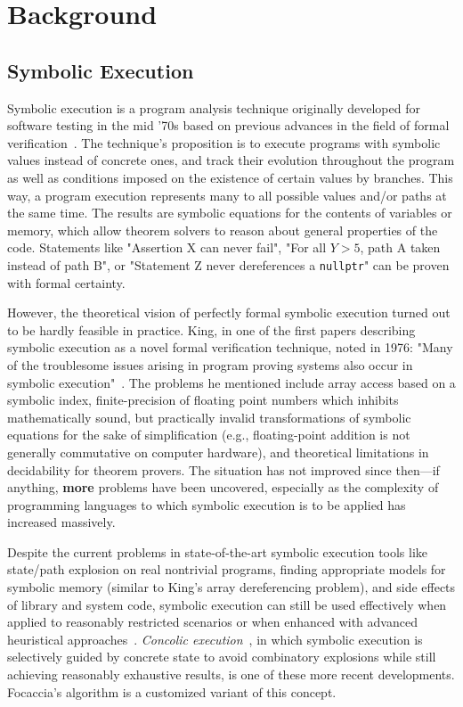 \chapter{Background}

\section{Symbolic Execution}

Symbolic execution is a program analysis technique originally developed for software testing in the mid '70s based on
previous advances in the field of formal verification~\cite{Boyer1975Select, King1975Effigy, Howden1977Dissect}. The
technique's proposition is to execute programs with symbolic values instead of concrete ones, and track their evolution
throughout the program as well as conditions imposed on the existence of certain values by branches. This way, a program
execution represents many to all possible values and/or paths at the same time. The results are symbolic equations for
the contents of variables or memory, which allow theorem solvers to reason about general properties of the code.
Statements like "Assertion X can never fail", "For all $Y > 5$, path A taken instead of path B", or
"Statement Z never dereferences a \texttt{nullptr}" can be proven with formal certainty.

However, the theoretical vision of perfectly formal symbolic execution turned out to be hardly feasible in practice.
King, in one of the first papers describing symbolic execution as a novel formal verification technique, noted in 1976:
"Many of the troublesome issues arising in program proving systems also occur in symbolic
execution"~\cite{King1976SymbExec}. The problems he mentioned include array access based on a symbolic index,
finite-precision of floating point numbers which inhibits mathematically sound, but practically invalid transformations
of symbolic equations for the sake of simplification (e.g., floating-point addition is not generally commutative on
computer hardware), and theoretical limitations in decidability for theorem provers. The situation has not improved
since then---if anything, \textbf{more} problems have been uncovered, especially as the complexity of programming
languages to which symbolic execution is to be applied has increased massively.

Despite the current problems in state-of-the-art symbolic execution tools like state/path explosion on real nontrivial
programs, finding appropriate models for symbolic memory (similar to King's array dereferencing problem), and side
effects of library and system code, symbolic execution can still be used effectively when applied to reasonably
restricted scenarios or when enhanced with advanced heuristical approaches~\cite{Baldoni2018SymbexecSurvey}.
\textit{Concolic execution}~\cite{Sen+2005Cute, Sen2007ConcolicTesting}, in which symbolic execution is selectively
guided by concrete state to avoid combinatory explosions while still achieving reasonably exhaustive results, is one of
these more recent developments. Focaccia's algorithm is a customized variant of this concept.


